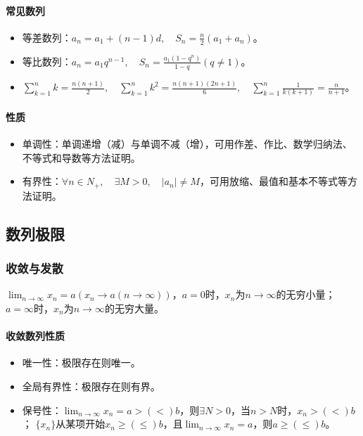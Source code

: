 \documentclass[
12pt, %
a4paper, 
oneside, %
]{scrartcl}
\begin{document}
\paragraph{常见数列}
\begin{itemize}
\item 等差数列：$ a_n = a_1 +(n - 1)d, \quad S_n = \frac{n}{2}(a_1 + a_n) $。
\item 等比数列：$ a_n = a_{1}q^{n - 1}, \quad S_n = \frac{a_1(1 - q^n)}{1 - q}(q \neq 1) $。
\item $ \sum_{k = 1}^{n} k = \frac{n(n + 1)}{2}, \quad \sum_{k = 1}^{n} k^2 = \frac{n(n + 1)(2n + 1)}{6}, \quad \sum_{k = 1}^{n} \frac{1}{k(k + 1)} = \frac{n}{n + 1} $。
\end{itemize}
\paragraph{性质}
\begin{itemize}
\item 单调性：单调递增（减）与单调不减（增），可用作差、作比、数学归纳法、不等式和导数等方法证明。
\item 有界性：$ \forall n \in N_+, \quad \exists M > 0, \quad |a_n| \neq M $，可用放缩、最值和基本不等式等方法证明。
\end{itemize}
\subsection[数列极限]{数列极限}
\subsubsection[收敛与发散]{收敛与发散}
$ \lim_{n \to \infty} x_n = a(x_n \to a(n \to \infty)) $，$ a = 0 $时，$ x_n $为$ n \to \infty $的无穷小量；$ a = \infty $时，$ x_n $为$ n \to \infty $的无穷大量。
\paragraph{收敛数列性质}
\begin{itemize}
\item 唯一性：极限存在则唯一。
\item 全局有界性：极限存在则有界。
\item 保号性：$ \lim_{n \to \infty} x_n = a >(<) b $，则$ \exists N > 0 $，当$ n > N $时，$ x_n >(<) b $； $ \{x_n\} $从某项开始$ x_n \geq(\leq) b $，且$ \lim_{n \to \infty} x_n = a $，则$ a \geq(\leq) b $。
\end{itemize}
\end{document}
